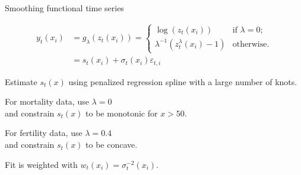 \documentclass[14pt]{beamer}
\begin{document}
\begin{frame}{\large Smoothing functional time series}

\begin{block}{}\vspace*{-0.6cm}
\begin{align*}
y_t(x_i) &= g_{\lambda}(z_t(x_i)) 
= \begin{cases}
\log(z_t(x_i)) & \text{if $\lambda=0$;}\\
\lambda^{-1}\left(z_t^\lambda(x_i) -1\right)  & \text{otherwise}.
\end{cases} \\
 &= s_t(x_i) + \sigma_t(x_i)\varepsilon_{t,i}
\end{align*}
\end{block}

\biz

\item Estimate $s_t(x)$ using penalized regression spline with a large number of knots.

\item For mortality data, use $\lambda=0$\\ and constrain $s_t(x)$ to be monotonic for $x>50$.

\item For fertility data, use $\lambda=0.4$\\ and constrain $s_t(x)$ to be concave.

\item Fit is weighted with $w_t(x_i) = \sigma_t^{-2}(x_i)$.

\eiz

\end{frame}
\end{document}
